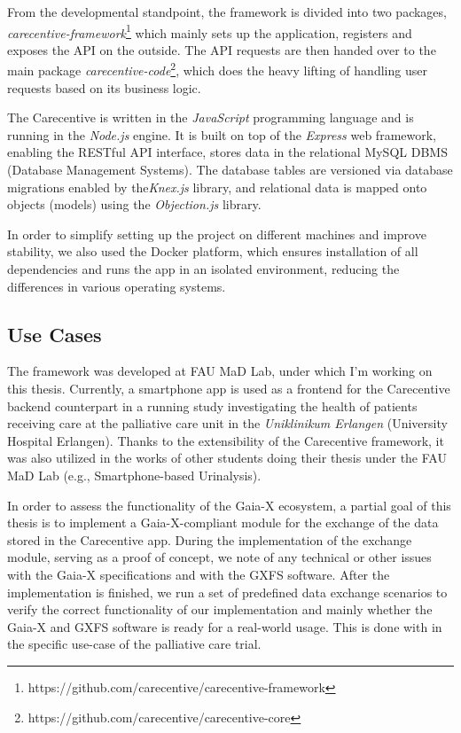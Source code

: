 From the developmental standpoint, the framework is divided into two packages, \textit{carecentive-framework}\footnote{https://github.com/carecentive/carecentive-framework} which mainly sets up the application, registers and exposes the API on the outside.
The API requests are then handed over to the main package \textit{carecentive-code}\footnote{https://github.com/carecentive/carecentive-core}, which does the heavy lifting of handling user requests based on its business logic.

The Carecentive is written in the \textit{JavaScript} programming language and is running in the \textit{Node.js} engine.
It is built on top of the \textit{Express} web framework, enabling the RESTful API interface, stores data in the relational MySQL DBMS (Database Management Systems).
The database tables are versioned via database migrations enabled by the\textit{Knex.js} library, and relational data is mapped onto objects (models) using the \textit{Objection.js} library.

In order to simplify setting up the project on different machines and improve stability, we also used the Docker platform, which ensures installation of all dependencies and runs the app in an isolated environment, reducing the differences in various operating systems.

\subsection{Use Cases}\label{subsec:use-cases}

The framework was developed at FAU MaD Lab, under which I'm working on this thesis.
Currently, a smartphone app is used as a frontend for the Carecentive backend counterpart in a running study investigating the health of patients receiving care at the palliative care unit in the \textit{Uniklinikum Erlangen} (University Hospital Erlangen).
Thanks to the extensibility of the Carecentive framework, it was also utilized in the works of other students doing their thesis under the FAU MaD Lab (e.g., Smartphone-based Urinalysis).


In order to assess the functionality of the Gaia-X ecosystem, a partial goal of this thesis is to implement a Gaia-X-compliant module for the exchange of the data stored in the Carecentive app.
During the implementation of the exchange module, serving as a proof of concept, we note of any technical or other issues with the Gaia-X specifications and with the GXFS software.
After the implementation is finished, we run a set of predefined data exchange scenarios to verify the correct functionality of our implementation and mainly whether the Gaia-X and GXFS software is ready for a real-world usage.
This is done with in the specific use-case of the palliative care trial.

